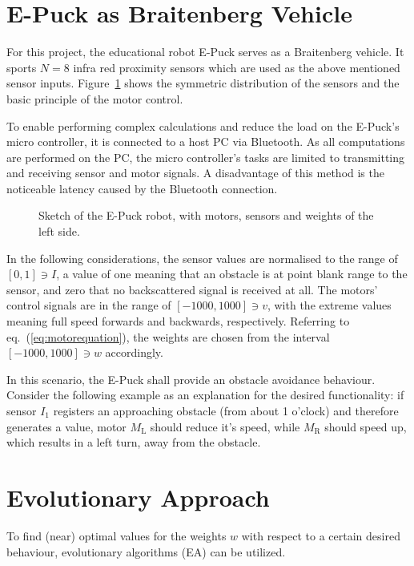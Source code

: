 \documentclass[a4paper]{jacow}
\begin{document}
\section{E-Puck as Braitenberg Vehicle}

For this project, the educational robot E-Puck serves as a Braitenberg vehicle. It sports $N=8$ infra red proximity sensors which are used as the above mentioned sensor inputs. Figure~\ref{fig:epuck} shows the symmetric distribution of the sensors and the basic principle of the motor control.

To enable performing complex calculations and reduce the load on the E-Puck's micro controller, it is connected to a host PC via Bluetooth. As all computations are performed on the PC, the micro controller's tasks are limited to transmitting and receiving sensor and motor signals. A disadvantage of this method is the noticeable latency caused by the Bluetooth connection.

\begin{figure}[hbt]
	\centering
	
	\caption{Sketch of the E-Puck robot, with motors, sensors and weights of the left side.}
	\label{fig:epuck}
\end{figure}

In the following considerations, the sensor values are normalised to the range of $[0,1]\ni I$, a value of one meaning that an obstacle is at point blank range to the sensor, and zero that no backscattered signal is received at all. The motors' control signals are in the range of $[-1000,1000]\ni v$, with the extreme values meaning full speed forwards and backwards, respectively. Referring to eq.~(\ref{eq:motorequation}), the weights are chosen from the interval $[-1000,1000]\ni w$ accordingly.

In this scenario, the E-Puck shall provide an obstacle avoidance behaviour. Consider the following example as an explanation for the desired functionality: if sensor $I_1$ registers an approaching obstacle (from about 1 o'clock) and therefore generates a value, motor $M_\mathrm{L}$ should reduce it's speed, while $M_\mathrm{R}$ should speed up, which results in a left turn, away from the obstacle.

\section{Evolutionary Approach}

To find (near) optimal values for the weights $w$ with respect to a certain desired behaviour, evolutionary algorithms (EA) can be utilized.
\end{document}
